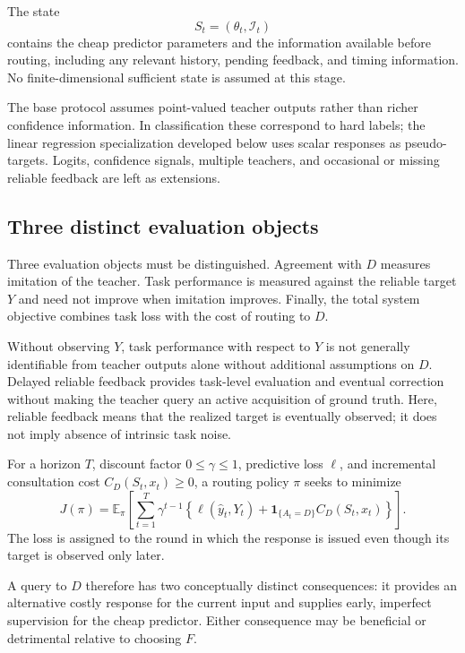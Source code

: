 The state
\begin{equation}
    S_t=(\theta_t,\mathcal I_t)
\end{equation}
contains the cheap predictor parameters and the information available before
routing, including any relevant history, pending feedback, and timing
information. No finite-dimensional sufficient state is assumed at this
stage.

The base protocol assumes point-valued teacher outputs rather than richer
confidence information. In classification these correspond to hard labels;
the linear regression specialization developed below uses scalar responses
as pseudo-targets. Logits, confidence signals, multiple teachers, and
occasional or missing reliable feedback are left as extensions.

\subsection{Three distinct evaluation objects}

Three evaluation objects must be distinguished. Agreement with $D$ measures
imitation of the teacher. Task performance is measured against the reliable
target $Y$ and need not improve when imitation improves. Finally, the total
system objective combines task loss with the cost of routing to $D$.

Without observing $Y$, task performance with respect to $Y$ is not generally
identifiable from teacher outputs alone without additional assumptions on
$D$. Delayed reliable feedback provides task-level evaluation and eventual
correction without making the teacher query an active acquisition of ground
truth. Here, reliable feedback means that the realized target is eventually
observed; it does not imply absence of intrinsic task noise.

For a horizon $T$, discount factor $0\leq\gamma\leq1$, predictive loss
$\ell$, and incremental consultation cost $C_D(S_t,x_t)\geq0$, a routing
policy $\pi$ seeks to minimize
\begin{equation}
    J(\pi)
    =
    \mathbb E_\pi\!\left[
        \sum_{t=1}^{T}\gamma^{t-1}
        \left\{
            \ell(\widehat y_t,Y_t)
            +
            \mathbf 1_{\{A_t=D\}}C_D(S_t,x_t)
        \right\}
    \right].
    \label{eq:sequential-objective}
\end{equation}
The loss is assigned to the round in which the response is issued even
though its target is observed only later.

A query to $D$ therefore has two conceptually distinct consequences: it
provides an alternative costly response for the current input and supplies
early, imperfect supervision for the cheap predictor. Either consequence
may be beneficial or detrimental relative to choosing $F$.

